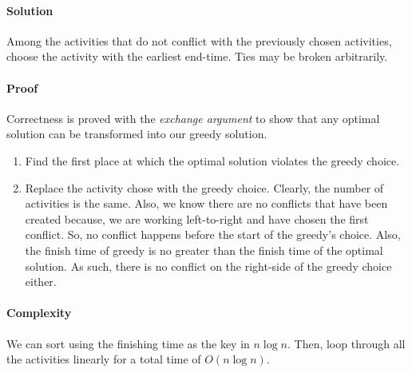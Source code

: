 \paragraph{Solution}
Among the activities that do not conflict with the previously chosen
activities, choose the activity with the earliest end-time.
Ties may be broken arbitrarily.

\paragraph{Proof}
Correctness is proved with the \textit{exchange argument} to show that
any optimal solution can be transformed into our greedy solution.
\begin{enumerate}
    \item Find the first place at which the optimal solution violates
    the greedy choice.
    \item Replace the activity chose with the greedy choice.
    Clearly, the number of activities is the same.
    Also, we know there are no conflicts that have been created because,
    we are working left-to-right and have chosen the first conflict.
    So, no conflict happens before the start of the greedy's choice.
    Also, the finish time of greedy is no greater than the finish
    time of the optimal solution. As such, there is no conflict
    on the right-side of the greedy choice either.
\end{enumerate}

\paragraph{Complexity}
We can sort using the finishing time as the key in \(n\log n\).
Then, loop through all the activities linearly for a total
time of \(O(n \log n)\).



